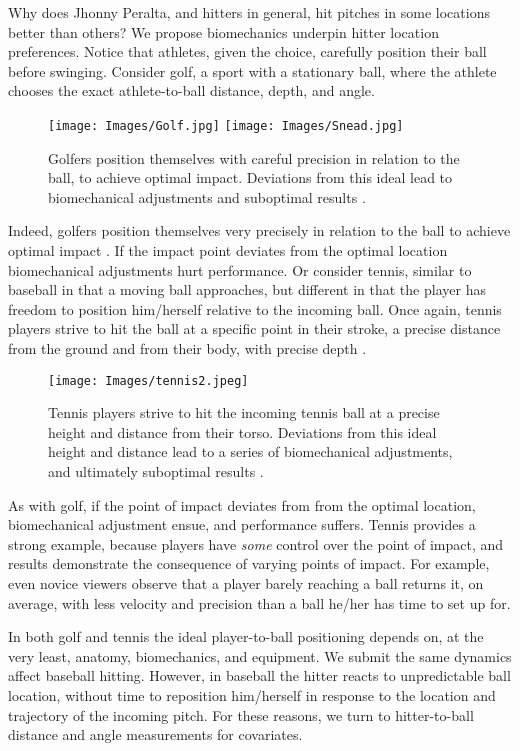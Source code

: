 Why does Jhonny Peralta, and hitters in general, hit pitches in some locations better than others? We propose biomechanics underpin hitter location preferences. Notice that athletes, given the choice, carefully position their ball before swinging. Consider golf, a sport with a stationary ball, where the athlete chooses the exact athlete-to-ball distance, depth, and angle. 
  \begin{figure}[H]
	\centering	
	\texttt{[image: Images/Golf.jpg]}
  \texttt{[image: Images/Snead.jpg]}
	\caption{Golfers position themselves with careful precision in relation to the ball, to achieve optimal impact. Deviations from this ideal lead to biomechanical adjustments and suboptimal results \citep{Cochran2005}.}
	\end{figure}
Indeed, golfers position themselves very precisely in relation to the ball to achieve optimal impact \citep{Cochran2005}. If the impact point deviates from the optimal location biomechanical adjustments hurt performance. Or consider tennis, similar to baseball in that a moving ball approaches, but different in that the player has freedom to position him/herself relative to the incoming ball. Once again, tennis players strive to hit the ball at a specific point in their stroke, a precise distance from the ground and from their body, with precise depth \citep{Elliott2006}. 
  \begin{figure}[H]
	\centering	
	\texttt{[image: Images/tennis2.jpeg]}
	\caption{Tennis players strive to hit the incoming tennis ball at a precise height and distance from their torso. Deviations from this ideal height and distance lead to a series of biomechanical adjustments, and ultimately suboptimal results \citep{Elliott2006}.}
	\end{figure}
As with golf, if the point of impact deviates from from the optimal location, biomechanical adjustment ensue, and performance suffers. Tennis provides a strong example, because players have {\it some} control over the point of impact, and results demonstrate the consequence of varying points of impact. For example, even novice viewers observe that a player barely reaching a ball returns it, on average, with less velocity and precision than a ball he/her has time to set up for.  

In both golf and tennis the ideal player-to-ball positioning depends on, at the very least, anatomy, biomechanics, and equipment. We submit the same dynamics affect baseball hitting. However, in baseball the hitter reacts to unpredictable ball location, without time to reposition him/herself in response to the location and trajectory of the incoming pitch. For these reasons, we turn to hitter-to-ball distance and angle measurements for covariates. 

